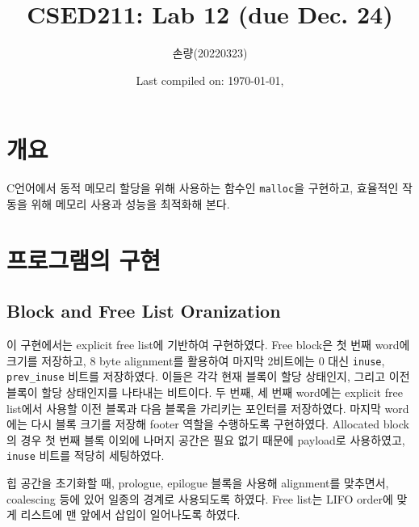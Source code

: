 \documentclass{scrartcl}
\title{CSED211: Lab 12 (due Dec. 24)}
\author{손량(20220323)}
\date{Last compiled on: \today, \currenttime}
\begin{document}
\maketitle

\section{개요}
C언어에서 동적 메모리 할당을 위해 사용하는 함수인 \texttt{malloc}을 구현하고,
효율적인 작동을 위해 메모리 사용과 성능을 최적화해 본다.

\section{프로그램의 구현}

\subsection{Block and Free List Oranization}
이 구현에서는 explicit free list에 기반하여 구현하였다. Free block은 첫 번째
word에 크기를 저장하고, 8 byte alignment를 활용하여 마지막 2비트에는 0 대신
\texttt{inuse}, \texttt{prev\_inuse} 비트를 저장하였다. 이들은 각각 현재 블록이
할당 상태인지, 그리고 이전 블록이 할당 상태인지를 나타내는 비트이다. 두 번째,
세 번째 word에는 explicit free list에서 사용할 이전 블록과 다음 블록을 가리키는
포인터를 저장하였다. 마지막 word에는 다시 블록 크기를 저장해 footer 역할을
수행하도록 구현하였다. Allocated block의 경우 첫 번째 블록 이외에 나머지 공간은
필요 없기 때문에 payload로 사용하였고, \texttt{inuse} 비트를 적당히 세팅하였다.

힙 공간을 초기화할 때, prologue, epilogue 블록을 사용해 alignment를 맞추면서,
coalescing 등에 있어 일종의 경계로 사용되도록 하였다. Free list는 LIFO order에
맞게 리스트에 맨 앞에서 삽입이 일어나도록 하였다.
\end{document}
